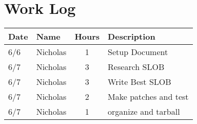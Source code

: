 \documentclass[letterpaper,10pt,fleqn,draftclsnofoot,onecolumn]{IEEEtran}
\begin{document}
	
	\section*{Work Log}
	\begin{tabular}{l l c p{1.1in}}\textbf{Date} & \textbf{Name} & \textbf{Hours} & \textbf{Description}\\\hline
		6/6 & Nicholas & 1 & Setup Document\\\hline
		6/7 & Nicholas & 3 & Research SLOB\\\hline
		6/7 & Nicholas & 3 & Write Best SLOB\\\hline
		6/7 & Nicholas & 2 & Make patches and test\\\hline
		6/7 & Nicholas & 1 & organize and tarball\\\hline



	\end{tabular}
		\nocite{*}
		
		
	
\end{document}
